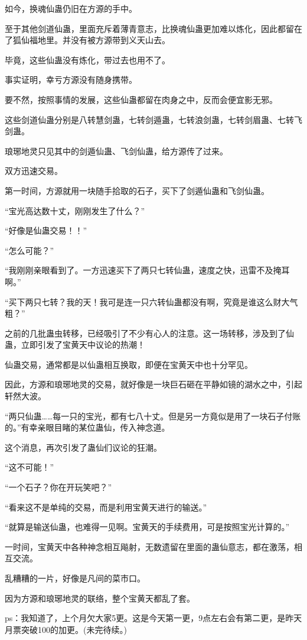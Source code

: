 \begin{this_body}
如今，换魂仙蛊仍旧在方源的手中。

至于其他剑道仙蛊，里面充斥着薄青意志，比换魂仙蛊更加难以炼化，因此都留在了狐仙福地里。并没有被方源带到义天山去。

毕竟，这些仙蛊没有炼化，带过去也用不了。

事实证明，幸亏方源没有随身携带。

要不然，按照事情的发展，这些仙蛊都留在肉身之中，反而会便宜影无邪。

这些剑道仙蛊分别是八转慧剑蛊，七转剑遁蛊，七转浪剑蛊，七转剑眉蛊、七转飞剑蛊。

琅琊地灵只见其中的剑遁仙蛊、飞剑仙蛊，给方源传了过来。

双方迅速交易。

第一时间，方源就用一块随手拾取的石子，买下了剑遁仙蛊和飞剑仙蛊。

“宝光高达数十丈，刚刚发生了什么？”

“好像是仙蛊交易！！”

“怎么可能？”

“我刚刚亲眼看到了。一方迅速买下了两只七转仙蛊，速度之快，迅雷不及掩耳啊。”

“买下两只七转？我的天！我可是连一只六转仙蛊都没有啊，究竟是谁这么财大气粗？”

之前的几批蛊虫转移，已经吸引了不少有心人的注意。这一场转移，涉及到了仙蛊，立即引发了宝黄天中议论的热潮！

仙蛊交易，通常都是以仙蛊相互换取，即便在宝黄天中也十分罕见。

因此，方源和琅琊地灵的交易，就好像是一块巨石砸在平静如镜的湖水之中，引起轩然大波。

“两只仙蛊……每一只的宝光，都有七八十丈。但是另一方竟似是用了一块石子付账的。”有幸亲眼目睹的某位蛊仙，传入神念道。

这个消息，再次引发了蛊仙们议论的狂潮。

“这不可能！”

“一个石子？你在开玩笑吧？”

“看来这不是单纯的交易，而是利用宝黄天进行的输送。”

“就算是输送仙蛊，也难得一见啊。宝黄天的手续费用，可是按照宝光计算的。”

一时间，宝黄天中各种神念相互飚射，无数遗留在里面的蛊仙意志，都在激荡，相互交流。

乱糟糟的一片，好像是凡间的菜市口。

因为方源和琅琊地灵的联络，整个宝黄天都乱了套。

ps：我知道了，上个月欠大家5更。这是今天第一更，9点左右会有第二更，是昨天月票突破100的加更。(未完待续。)

\end{this_body}

